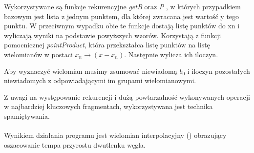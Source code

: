 \documentclass[12pt]{article}
\begin{document}
Wykorzystywane są funkcje rekurencyjne \emph{getB} oraz \emph{P} , w których przypadkiem bazowym jest lista z jednym punktem, dla której zwracana jest wartość y tego punktu. W przeciwnym wypadku obie te funkcje dostają listę punktów do xn i wyliczają wyniki na podstawie powyższych wzorów. Korzystają z funkcji pomocnicznej \emph{pointProduct}, która przekształca listę punktów na listę wielomianów w postaci $x_n \rightarrow (x-x_n)$. Następnie wylicza ich iloczyn. 

Aby wyznaczyć wielomian musimy zsumować niewiadomą $b_0$ i iloczyn pozostałych niewiadomych z odpowiadającymi im grupami wielomianowymi. 

Z uwagi na występowanie rekurencji i dużą powtarzalność wykonywanych operacji
w najbardziej kluczowych fragmentach, wykorzystywana jest technika spamiętywania.
\\ \\
Wynikiem działania programu jest wielomian interpolacyjny () obrazujący oszacowanie tempa przyrostu dwutlenku węgla.
\newpage
\end{document}
